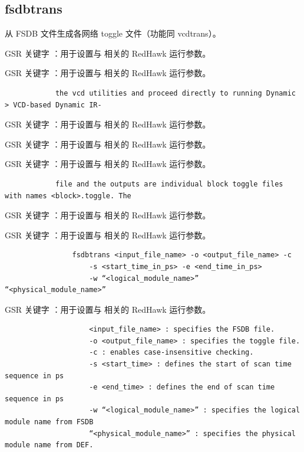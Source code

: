 \subsection*{fsdbtrans}

从 FSDB 文件生成各网络 toggle 文件（功能同 vcdtrans）。

GSR 关键字 ：用于设置与  相关的 RedHawk 运行参数。

GSR 关键字 ：用于设置与  相关的 RedHawk 运行参数。

\begin{lstlisting}
            the vcd utilities and proceed directly to running Dynamic > VCD-based Dynamic IR-
\end{lstlisting}

GSR 关键字 ：用于设置与  相关的 RedHawk 运行参数。

GSR 关键字 ：用于设置与  相关的 RedHawk 运行参数。

GSR 关键字 ：用于设置与  相关的 RedHawk 运行参数。

\begin{lstlisting}
            file and the outputs are individual block toggle files with names <block>.toggle. The
\end{lstlisting}

GSR 关键字 ：用于设置与  相关的 RedHawk 运行参数。

GSR 关键字 ：用于设置与  相关的 RedHawk 运行参数。

\begin{lstlisting}
                fsdbtrans <input_file_name> -o <output_file_name> -c
                    -s <start_time_in_ps> -e <end_time_in_ps>
                    -w “<logical_module_name>” “<physical_module_name>”
\end{lstlisting}

GSR 关键字 ：用于设置与  相关的 RedHawk 运行参数。

\begin{lstlisting}
                    <input_file_name> : specifies the FSDB file.
                    -o <output_file_name> : specifies the toggle file.
                    -c : enables case-insensitive checking.
                    -s <start_time> : defines the start of scan time sequence in ps
                    -e <end_time> : defines the end of scan time sequence in ps
                    -w “<logical_module_name>” : specifies the logical module name from FSDB
                    “<physical_module_name>” : specifies the physical module name from DEF.
\end{lstlisting}

